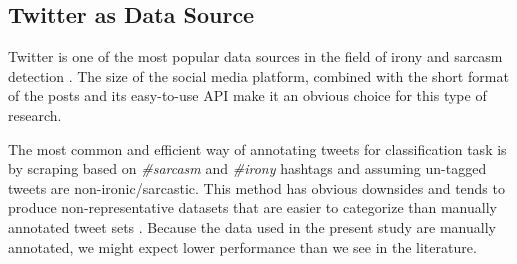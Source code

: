 \subsection{Twitter as Data Source}

Twitter is one of the most popular data sources in the field of irony and sarcasm detection \cite{sarcasm_detection,wang2015twitter, irony_detect_twitter}. The size of the social media platform, combined with the short format of the posts and its easy-to-use API make it an obvious choice for this type of research. 

The most common and efficient way of annotating tweets for classification task is by scraping based on \emph{\#sarcasm} and  \emph{\#irony} hashtags \cite{reyes2012humor, liebrecht2013perfect} and assuming un-tagged tweets are non-ironic/sarcastic. This method has obvious downsides and tends to produce non-representative datasets that are easier to categorize than manually annotated tweet sets \cite{sarcasm_detection}. Because the data used in the present study are manually annotated, we might expect lower performance than we see in the literature. 
